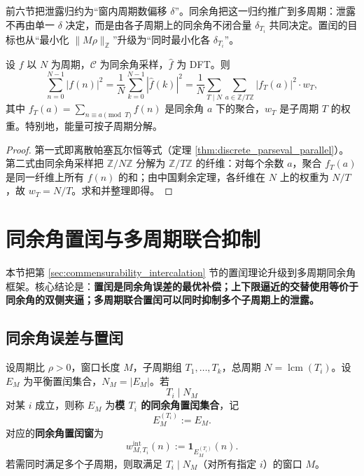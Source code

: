 \begin{remark}[同余角是泄露的统一语言]\label{rem:congruence_angle_unified_leakage}
前六节把泄露归约为“窗内周期数偏移 $\delta$”。同余角把这一归约推广到多周期：泄露不再由单一 $\delta$ 决定，而是由各子周期上的同余角不闭合量 $\delta_{T_i}$ 共同决定。置闰的目标也从“最小化 $\|M\rho\|_{\mathbb{Z}}$”升级为“同时最小化各 $\delta_{T_i}$”。
\end{remark}

\begin{theorem}\label{thm:congruence_parseval}
设 $f$ 以 $N$ 为周期，$\mathcal{C}$ 为同余角采样，$\hat f$ 为 DFT。则
\[
\sum_{n=0}^{N-1}|f(n)|^2 = \frac{1}{N}\sum_{k=0}^{N-1}|\hat f(k)|^2
= \frac{1}{N}\sum_{T\mid N}\sum_{a\in\mathbb{Z}/T\mathbb{Z}}|f_T(a)|^2\cdot w_T,
\]
其中 $f_T(a)=\sum_{n\equiv a\pmod T}f(n)$ 是同余角 $a$ 下的聚合，$w_T$ 是子周期 $T$ 的权重。特别地，能量可按子周期分解。
\end{theorem}

\begin{proof}
第一式即离散帕塞瓦尔恒等式（定理 \ref{thm:discrete_parseval_parallel}）。第二式由同余角采样把 $\mathbb{Z}/N\mathbb{Z}$ 分解为 $\mathbb{Z}/T\mathbb{Z}$ 的纤维：对每个余数 $a$，聚合 $f_T(a)$ 是同一纤维上所有 $f(n)$ 的和；由中国剩余定理，各纤维在 $N$ 上的权重为 $N/T$，故 $w_T=N/T$。求和并整理即得。
\end{proof}

\section{同余角置闰与多周期联合抑制}\label{sec:congruence_angle_intercalation}

本节把第 \ref{sec:commensurability_intercalation} 节的置闰理论升级到多周期同余角框架。核心结论是：\textbf{置闰是同余角误差的最优补偿；上下限逼近的交替使用等价于同余角的双侧夹逼；多周期联合置闰可以同时抑制多个子周期上的泄露。}

\subsection{同余角误差与置闰}

\begin{definition}[同余角置闰]\label{def:congruence_angle_intercalation}
设周期比 $\rho>0$，窗口长度 $M$，子周期组 $T_1,\dots,T_k$，总周期 $N=\operatorname{lcm}(T_i)$。设 $E_M$ 为平衡置闰集合，$N_M=|E_M|$。若
\[
T_i\mid N_M
\]
对某 $i$ 成立，则称 $E_M$ 为\textbf{模 $T_i$ 的同余角置闰集合}，记
\[
E_M^{(T_i)}:=E_M.
\]
对应的\textbf{同余角置闰窗}为
\[
w^{\mathrm{int}}_{M,T_i}(n):=\mathbf{1}_{E_M^{(T_i)}}(n).
\]
若需同时满足多个子周期，则取满足 $T_i\mid N_M$（对所有指定 $i$）的窗口 $M$。
\end{definition}

